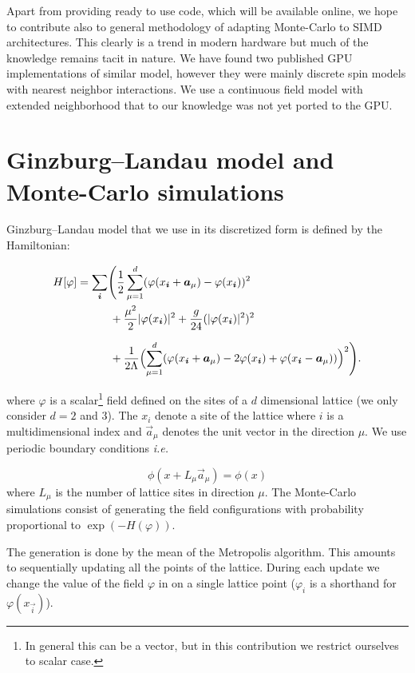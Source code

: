 \documentclass[a4paper]{llncs}
\renewcommand{\a}[1]{\v{a}_{#1}}
\renewcommand{\v}[1]{\vec{#1}}
\newcommand{\vphi}{\varphi}
\newcommand{\vi}{{\vec{i}}}
\newcommand{\ie}{{\textit{i.e.}}}
\begin{document}
Apart from providing ready to use code, which will be available online, we hope
to contribute also to general methodology of adapting Monte-Carlo to SIMD
architectures. This clearly is a trend in modern hardware but much of the
knowledge remains tacit in nature. We have found two published GPU
implementations of similar model, however they were mainly discrete spin models
with nearest neighbor interactions\cite{spin1,spin2,weigel}. We use a
continuous field model with extended neighborhood that to our knowledge was not
yet ported to the GPU.

\section{Ginzburg--Landau model and Monte-Carlo simulations}

Ginzburg--Landau model that we use in its discretized form is defined by the
Hamiltonian\cite{parisi}:

\begin{equation*}\label{eq:hamiltonian}\begin{split}
H[\varphi]&=\sum_{\vi}\Biggl(
\frac{1}{2}\sum_{\mu=1}^d(\vphi(x_\vi+\a{\mu})-\vphi(x_\vi))^2\\
&\phantom{=\sum_{\vi}\bigl(}+\frac{\mu^2}{2}|\vphi(x_{\vi})|^2+
\frac{g}{24}(|\vphi(x_{\vi})|^2)^2\\
&\phantom{=\sum_{\vi}\bigl(}+
\frac{1}{2\Lambda}\Bigl(\sum_{\mu=1}^d
(\vphi(x_\vi+\a{\mu})-2\vphi(x_{\vi})+\vphi(x_\vi-\a\mu))\Bigr)^2\Biggr).
\end{split}
\end{equation*}

where $\vphi$ is a scalar\footnote{In general this can be a vector, but in this
contribution we restrict ourselves to scalar case.} field defined on the sites
of a $d$ dimensional lattice (we only consider $d=2$ and $3$). The $x_i$ denote
a site of the lattice where $i$ is a multidimensional index and $\a\mu$ denotes
the unit vector in the direction $\mu$. We use periodic boundary conditions \ie

\begin{equation}
\phi(x+L_{\mu}\a\mu)=\phi(x)
\end{equation}
where  $L_\mu$ is the number of lattice sites in direction $\mu$.
The Monte-Carlo simulations consist of
generating the field configurations with probability proportional to
$\exp(-H(\vphi))$.

The generation is done by the mean of the Metropolis
algorithm\cite{metropolis,binney}. This amounts to sequentially updating all
the points of the lattice. During each update we change the value of the field
$\vphi$ in on a single lattice point ($\vphi_i$ is a shorthand for
$\vphi(x_\vi)$).
\end{document}
